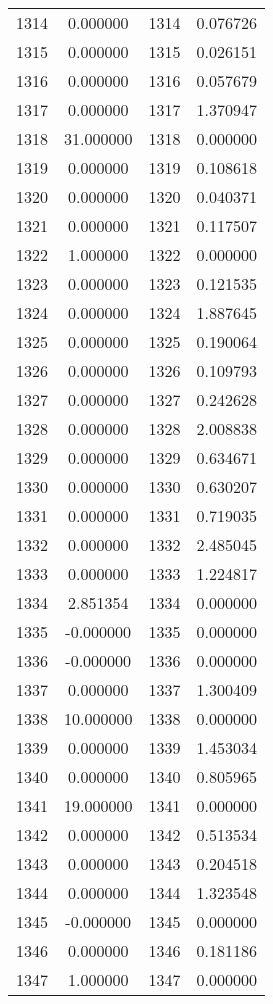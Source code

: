 \documentclass[12pt]{article}
\begin{document}
\begin{longtable}{@{}cccc@{}}
1314 & 0.000000 & 1314 & 0.076726 \\
1315 & 0.000000 & 1315 & 0.026151 \\
1316 & 0.000000 & 1316 & 0.057679 \\
1317 & 0.000000 & 1317 & 1.370947 \\
1318 & 31.000000 & 1318 & 0.000000 \\
1319 & 0.000000 & 1319 & 0.108618 \\
1320 & 0.000000 & 1320 & 0.040371 \\
1321 & 0.000000 & 1321 & 0.117507 \\
1322 & 1.000000 & 1322 & 0.000000 \\
1323 & 0.000000 & 1323 & 0.121535 \\
1324 & 0.000000 & 1324 & 1.887645 \\
1325 & 0.000000 & 1325 & 0.190064 \\
1326 & 0.000000 & 1326 & 0.109793 \\
1327 & 0.000000 & 1327 & 0.242628 \\
1328 & 0.000000 & 1328 & 2.008838 \\
1329 & 0.000000 & 1329 & 0.634671 \\
1330 & 0.000000 & 1330 & 0.630207 \\
1331 & 0.000000 & 1331 & 0.719035 \\
1332 & 0.000000 & 1332 & 2.485045 \\
1333 & 0.000000 & 1333 & 1.224817 \\
1334 & 2.851354 & 1334 & 0.000000 \\
1335 & -0.000000 & 1335 & 0.000000 \\
1336 & -0.000000 & 1336 & 0.000000 \\
1337 & 0.000000 & 1337 & 1.300409 \\
1338 & 10.000000 & 1338 & 0.000000 \\
1339 & 0.000000 & 1339 & 1.453034 \\
1340 & 0.000000 & 1340 & 0.805965 \\
1341 & 19.000000 & 1341 & 0.000000 \\
1342 & 0.000000 & 1342 & 0.513534 \\
1343 & 0.000000 & 1343 & 0.204518 \\
1344 & 0.000000 & 1344 & 1.323548 \\
1345 & -0.000000 & 1345 & 0.000000 \\
1346 & 0.000000 & 1346 & 0.181186 \\
1347 & 1.000000 & 1347 & 0.000000 \\

\end{longtable}
\end{document}
